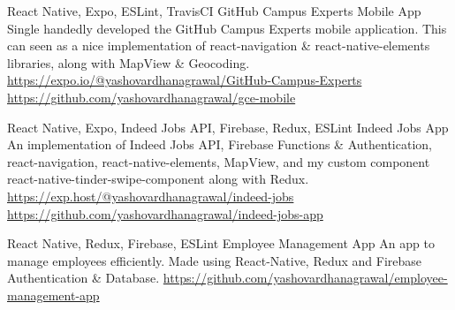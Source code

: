 \begin{cventries}
	\cventry
	{React Native, Expo, ESLint, TravisCI}
	{GitHub Campus Experts Mobile App}
	{}
	{}
	{Single handedly developed the GitHub Campus Experts mobile application. This can seen as a nice implementation of react-navigation \& react-native-elements libraries, along with MapView \& Geocoding. \newline \vspace{1mm}
	\url{https://expo.io/@yashovardhanagrawal/GitHub-Campus-Experts} \newline
	\url{https://github.com/yashovardhanagrawal/gce-mobile}}

	\cventry
	{React Native, Expo, Indeed Jobs API, Firebase, Redux, ESLint}
	{Indeed Jobs App}
	{}
	{}
	{An implementation of Indeed Jobs API, Firebase Functions \& Authentication, react-navigation, react-native-elements, MapView, and my custom component react-native-tinder-swipe-component along with Redux. \newline \vspace{1mm}
	\url{https://exp.host/@yashovardhanagrawal/indeed-jobs} \newline
	\url{https://github.com/yashovardhanagrawal/indeed-jobs-app}}

	\cventry
	{React Native, Redux, Firebase, ESLint}
	{Employee Management App}
	{}
	{}
	{An app to manage employees efficiently. Made using React-Native, Redux and Firebase Authentication \& Database. \newline \vspace{1mm}
	\url{https://github.com/yashovardhanagrawal/employee-management-app}}
	
\end{cventries}
